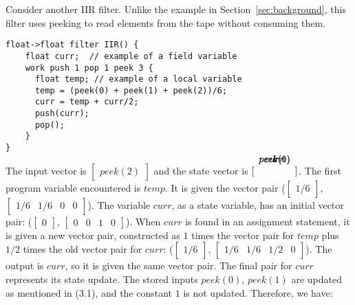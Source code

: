 
Consider another IIR filter.  Unlike the example in
Section~\ref{sec:background}, this filter uses peeking to read
elements from the tape without consuming them.

\begin{singlespace}
\vspace{-12pt}
\small
\begin{verbatim}
float->float filter IIR() {
    float curr;  // example of a field variable
    work push 1 pop 1 peek 3 {
      float temp; // example of a local variable
      temp = (peek(0) + peek(1) + peek(2))/6;
      curr = temp + curr/2;
      push(curr);
      pop();
    }
}
\end{verbatim}
\vspace{-36pt}
\end{singlespace}
    The input vector is $\left [ \begin{array} {c} peek(2) \end{array}
\right ]$ and the state vector is $\left [ \begin{array} {c} \vspace{-36pt} \\ \vspace{-12pt} peek(0) \\ \vspace{-12pt}
peek(1) \\ \vspace{-12pt} curr \\ \vspace{-12pt} 1 \vspace{12pt} \end{array} \right ]$. The first program
variable encountered is $temp$. It is given the vector pair
($\left [ \begin{array} {c} 1/6 \end{array} \right ]$, $\left [
\begin{array} {cccc} 1/6 & 1/6 & 0 & 0 \end{array} \right ]$). The
variable $curr$, as a state variable, has an initial vector pair:
($\left [ \begin{array} {c} 0 \end{array} \right ]$, $\left
[\begin{array} {cccc} 0 & 0 & 1 & 0
\end{array} \right ]$). When $curr$ is found in an assignment
statement, it is given a new vector pair, constructed as $1$ times
the vector pair for $temp$ plus $1/2$ times the old vector pair
for $curr$: ($\left [ \begin{array} {c} 1/6 \end{array} \right ]$,
$\left [ \begin{array} {cccc} 1/6 & 1/6 & 1/2 & 0 \end{array}
\right ]$). The output is $curr$, so it is given the same vector
pair. The final pair for $curr$ represents its state update. The
stored inputs $peek(0)$, $peek(1)$ are updated as mentioned in
(3.1), and the constant $1$ is not updated. Therefore, we have:

